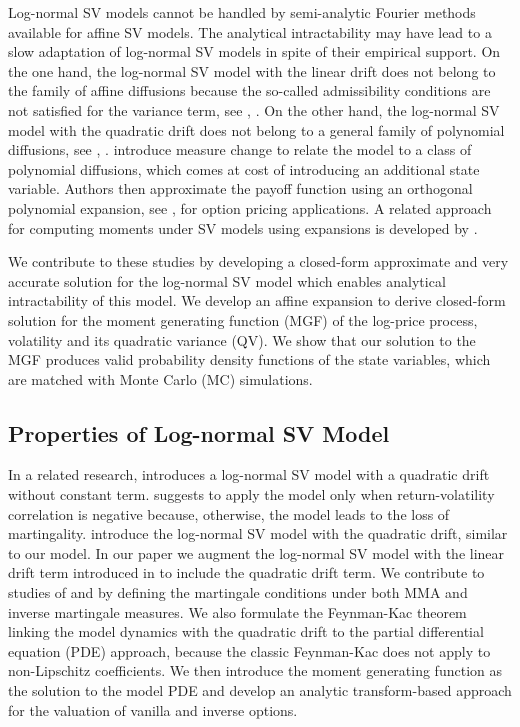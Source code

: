 \documentclass[11pt,a4paper] {article}
\begin{document}
Log-normal SV models cannot be handled by semi-analytic Fourier methods available for affine SV models. The analytical intractability may have lead to a slow adaptation of log-normal SV models in spite of their empirical support. On the one hand, the log-normal SV model with the linear drift does not belong to the family of affine diffusions because the so-called admissibility conditions are not satisfied for the variance term, see \cite{DuffieFilipSchacer03}, \cite{FilipMayer09}. On the other hand, the log-normal SV model with the quadratic drift does not belong to a general family of polynomial diffusions, see  \cite{Filip16}, \cite{CuchKellRessTeich12}. \cite{CarrWill} introduce measure change to relate the model to a class of polynomial diffusions, which comes at cost of introducing an additional state variable. Authors then approximate the payoff function using an orthogonal polynomial expansion, see \cite{Filip19}, for option pricing applications. A related approach for computing moments under SV models using expansions is developed by \cite{Alos2020}.

We contribute to these studies by developing a closed-form approximate and very accurate solution for the log-normal SV model which enables analytical intractability of this model. We develop an affine expansion to derive closed-form solution for the moment generating function (MGF) of the log-price process, volatility and its quadratic variance (QV). We show that our solution to the MGF produces valid probability density functions of the state variables, which are matched with Monte Carlo (MC) simulations. 




\subsection{Properties of Log-normal SV Model}

In a related research, \cite{Lewis2019} introduces a log-normal SV model with a quadratic drift without constant term. \cite{Lewis2019} suggests to apply the model only when return-volatility correlation is negative because, otherwise, the model leads to the loss of martingality. \cite{CarrWill} introduce the log-normal SV model with the quadratic drift, similar to our model. In our paper we augment the log-normal SV model with the linear drift term introduced in \cite{Sepp2012} to include the quadratic drift term. We contribute to studies of \cite{Lewis2019} and \cite{CarrWill} by defining the martingale conditions under both MMA and inverse martingale measures. We also formulate the Feynman-Kac theorem linking the model dynamics with the quadratic drift to the partial differential equation (PDE) approach, because the classic Feynman-Kac does not apply to non-Lipschitz coefficients. We then introduce the moment generating function as the solution to the model PDE and develop an analytic transform-based approach for the valuation of vanilla and inverse options. 
\end{document}
